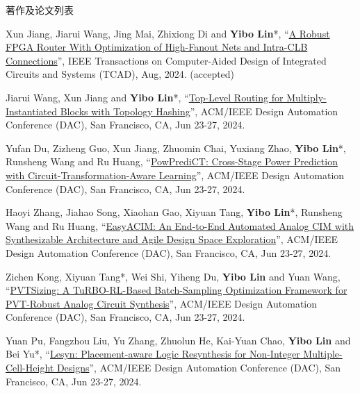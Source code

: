 \begin{rSection}{著作及论文列表}
\begin{description}[font=\normalfont, rightmargin=2em]
{}
            

\item[{[J157]}]{
        Xun Jiang, Jiarui Wang, Jing Mai, Zhixiong Di and \textbf{Yibo Lin}*, 
    ``\href{https://doi.org/10.1109/TCAD.2024.3447218}{A Robust FPGA Router With Optimization of High-Fanout Nets and Intra-CLB Connections}'', 
    IEEE Transactions on Computer-Aided Design of Integrated Circuits and Systems (TCAD), Aug, 2024.
    (accepted)
}
            

\item[{[C156]}]{
        Jiarui Wang, Xun Jiang and \textbf{Yibo Lin}*, 
    ``\href{https://doi.org/10.1145/3649329.3655900}{Top-Level Routing for Multiply-Instantiated Blocks with Topology Hashing}'', 
    ACM/IEEE Design Automation Conference (DAC), San Francisco, CA, Jun 23-27, 2024.
    
}
            

\item[{[C155]}]{
        Yufan Du, Zizheng Guo, Xun Jiang, Zhuomin Chai, Yuxiang Zhao, \textbf{Yibo Lin}*, Runsheng Wang and Ru Huang, 
    ``\href{https://doi.org/10.1145/3649329.3657349}{PowPrediCT: Cross-Stage Power Prediction with Circuit-Transformation-Aware Learning}'', 
    ACM/IEEE Design Automation Conference (DAC), San Francisco, CA, Jun 23-27, 2024.
    
}
            

\item[{[C154]}]{
        Haoyi Zhang, Jiahao Song, Xiaohan Gao, Xiyuan Tang, \textbf{Yibo Lin}*, Runsheng Wang and Ru Huang, 
    ``\href{https://doi.org/10.1145/3649329.3656229}{EasyACIM: An End-to-End Automated Analog CIM with Synthesizable Architecture and Agile Design Space Exploration}'', 
    ACM/IEEE Design Automation Conference (DAC), San Francisco, CA, Jun 23-27, 2024.
    
}
            

\item[{[C153]}]{
        Zichen Kong, Xiyuan Tang*, Wei Shi, Yiheng Du, \textbf{Yibo Lin} and Yuan Wang, 
    ``\href{https://doi.org/10.1145/3649329.3661850}{PVTSizing: A TuRBO-RL-Based Batch-Sampling Optimization Framework for PVT-Robust Analog Circuit Synthesis}'', 
    ACM/IEEE Design Automation Conference (DAC), San Francisco, CA, Jun 23-27, 2024.
    
}
            

\item[{[C152]}]{
        Yuan Pu, Fangzhou Liu, Yu Zhang, Zhuolun He, Kai-Yuan Chao, \textbf{Yibo Lin} and Bei Yu*, 
    ``\href{https://doi.org/10.1145/3649329.3656243}{Lesyn: Placement-aware Logic Resynthesis for Non-Integer Multiple-Cell-Height Designs}'', 
    ACM/IEEE Design Automation Conference (DAC), San Francisco, CA, Jun 23-27, 2024.
    
}
\end{description}
\end{rSection}
